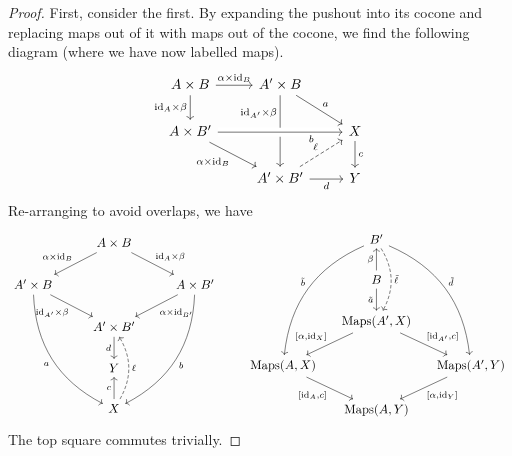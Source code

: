 \documentclass[main.tex]{subfiles}
\begin{document}
\begin{proof}
  First, consider the first. By expanding the pushout into its cocone and replacing maps out of it with maps out of the cocone, we find the following diagram (where we have now labelled maps).
  \begin{equation*}
    \begin{tikzcd}
      A \times B
      \arrow[r, "\alpha \times \id_{B}"]
      \arrow[d, swap, "\id_{A} \times \beta"]
      & A' \times B
      \arrow[dd, near start, swap, "\id_{A'} \times \beta"]
      \arrow[dr, "a"]
      \\
      A \times B'
      \arrow[rr, near end, swap, crossing over, "b"]
      \arrow[dr, swap, "\alpha \times \id_{B}"]
      && X
      \arrow[d, "c"]
      \\
      & A' \times B'
      \arrow[ur, dashed, "\ell"]
      \arrow[r, swap, "d"]
      & Y
    \end{tikzcd}
  \end{equation*}
  Re-arranging to avoid overlaps, we have
  \begin{equation*}
    \begin{tikzcd}
      & A \times B
      \arrow[dr, "\id_{A} \times \beta"]
      \arrow[dl, swap, "\alpha \times \id_{B}"]
      \\
      A' \times B
      \arrow[dddr, bend right, swap, "a"]
      \arrow[dr, swap, "\id_{A'} \times \beta"]
      && A \times B'
      \arrow[dddl, bend left, "b"]
      \arrow[dl, "\alpha \times \id_{B'}"]
      \\
      & A' \times B'
      \arrow[d, swap, "d"]
      \\
      & Y
      \\
      & X
      \arrow[u, "c"]
      \arrow[uu, bend right, dashed, swap, "\ell"]
    \end{tikzcd}
    \qquad
    \begin{tikzcd}[column sep=small]
      & B'
      \arrow[dd, bend left, dashed, "\tilde{\ell}"]
      \arrow[dddr, bend left, "\tilde{d}"]
      \arrow[dddl, bend right, swap, "\tilde{b}"]
      \\
      & B
      \arrow[u, "\beta"]
      \arrow[d, swap, "\tilde{a}"]
      \\
      & \Maps(A', X)
      \arrow[dr, "{[\id_{A'}, c]}"]
      \arrow[dl, swap, "{[\alpha, \id_{X}]}"]
      \\
      \Maps(A, X)
      \arrow[dr, swap, "{[\id_{A}, c]}"]
      && \Maps(A', Y)
      \arrow[dl, "{[\alpha, \id_{Y}]}"]
      \\
      & \Maps(A, Y)
    \end{tikzcd}
  \end{equation*}
  The top square commutes trivially.


\end{proof}
\end{document}
